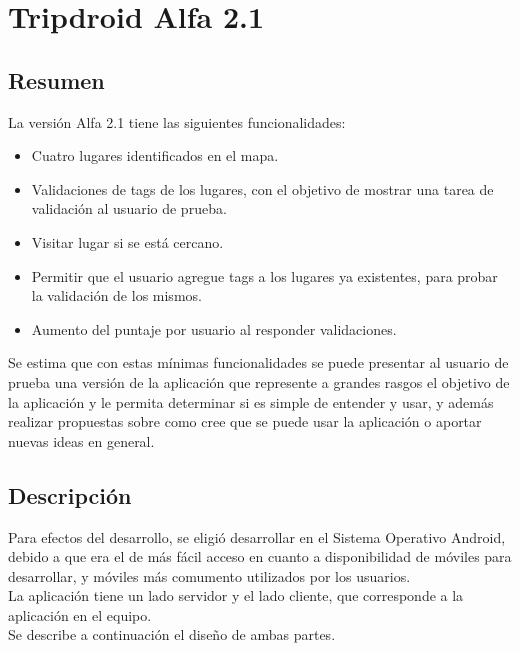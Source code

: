 \documentclass[10pt,letterpaper]{article}
\begin{document}
\newpage
\section{Tripdroid Alfa 2.1}

\subsection{Resumen}

La versión Alfa 2.1 tiene las siguientes funcionalidades:

\begin{itemize}
\item Cuatro lugares identificados en el mapa.

\item Validaciones de tags de los lugares, con el objetivo de mostrar una tarea de validación al usuario de prueba.

\item Visitar lugar si se está cercano.

\item Permitir que el usuario agregue tags a los lugares ya existentes, para probar la validación de los mismos.

\item Aumento del puntaje por usuario al responder validaciones.
\end{itemize}

Se estima que con estas mínimas funcionalidades se puede presentar al usuario de prueba una versión de la aplicación que represente a grandes rasgos el objetivo de la aplicación y le permita determinar si es simple de entender y usar, y además realizar propuestas sobre como cree que se puede usar la aplicación o aportar nuevas ideas en general.

\subsection{Descripción}

Para efectos del desarrollo, se eligió desarrollar en el Sistema Operativo Android, debido a que era el de más fácil acceso en cuanto a disponibilidad de móviles para desarrollar, y móviles más comumento utilizados por los usuarios.\\

La aplicación tiene un lado servidor y el lado cliente, que corresponde a la aplicación en el equipo.\\

Se describe a continuación el diseño de ambas partes.
\end{document}
